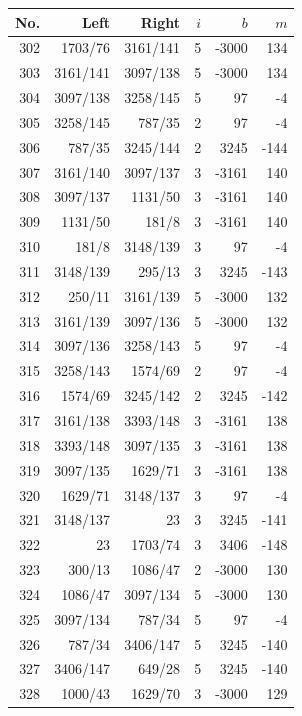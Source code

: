 \documentclass[11pt,a4paper]{article}
\begin{document}
\begin{minipage}[t]{.49\linewidth}\centering\footnotesize\setlength{\tabcolsep}{2pt}\renewcommand{\arraystretch}{1.09}
\begin{tabular*}{\linewidth}{@{}r@{\extracolsep{\fill}}rrrrr@{}}\toprule
No. & Left & Right & $i$ & $b$ & $m$\\\midrule
302 & 1703/76 & 3161/141 & 5 & -3000 & 134\\
303 & 3161/141 & 3097/138 & 5 & -3000 & 134\\
304 & 3097/138 & 3258/145 & 5 & 97 & -4\\
305 & 3258/145 & 787/35 & 2 & 97 & -4\\
306 & 787/35 & 3245/144 & 2 & 3245 & -144\\
307 & 3161/140 & 3097/137 & 3 & -3161 & 140\\
308 & 3097/137 & 1131/50 & 3 & -3161 & 140\\
309 & 1131/50 & 181/8 & 3 & -3161 & 140\\
310 & 181/8 & 3148/139 & 3 & 97 & -4\\
311 & 3148/139 & 295/13 & 3 & 3245 & -143\\
312 & 250/11 & 3161/139 & 5 & -3000 & 132\\
313 & 3161/139 & 3097/136 & 5 & -3000 & 132\\
314 & 3097/136 & 3258/143 & 5 & 97 & -4\\
315 & 3258/143 & 1574/69 & 2 & 97 & -4\\
316 & 1574/69 & 3245/142 & 2 & 3245 & -142\\
317 & 3161/138 & 3393/148 & 3 & -3161 & 138\\
318 & 3393/148 & 3097/135 & 3 & -3161 & 138\\
319 & 3097/135 & 1629/71 & 3 & -3161 & 138\\
320 & 1629/71 & 3148/137 & 3 & 97 & -4\\
321 & 3148/137 & 23 & 3 & 3245 & -141\\
322 & 23 & 1703/74 & 3 & 3406 & -148\\
323 & 300/13 & 1086/47 & 2 & -3000 & 130\\
324 & 1086/47 & 3097/134 & 5 & -3000 & 130\\
325 & 3097/134 & 787/34 & 5 & 97 & -4\\
326 & 787/34 & 3406/147 & 5 & 3245 & -140\\
327 & 3406/147 & 649/28 & 5 & 3245 & -140\\
328 & 1000/43 & 1629/70 & 3 & -3000 & 129\\

\end{tabular*}
\end{minipage}
\end{document}
